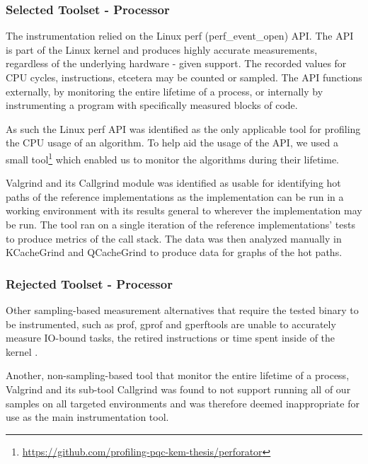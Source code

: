 \subsubsection{Selected Toolset - Processor}
\label{section:method:experiment:phase1:selected-toolset-processor}
The instrumentation relied on the Linux perf (perf\_event\_open) API. The API is part of the Linux kernel and produces highly accurate measurements, regardless of the underlying hardware - given support. The recorded values for CPU cycles, instructions, etcetera may be counted or sampled. The API functions externally, by monitoring the entire lifetime of a process, or internally by instrumenting a program with specifically measured blocks of code.

As such the Linux perf API was identified as the only applicable tool for profiling the CPU usage of an algorithm. To help aid the usage of the API, we used a small tool\footnote{\href{https://github.com/profiling-pqc-kem-thesis/perforator}{https://github.com/profiling-pqc-kem-thesis/perforator}} which enabled us to monitor the algorithms during their lifetime.

Valgrind and its Callgrind module was identified as usable for identifying hot paths of the reference implementations as the implementation can be run in a working environment with its results general to wherever the implementation may be run. The tool ran on a single iteration of the reference implementations' tests to produce metrics of the call stack. The data was then analyzed manually in KCacheGrind and QCacheGrind to produce data for graphs of the hot paths.

\subsubsection{Rejected Toolset - Processor}
\label{section:method:experiment:phase1:rejected-toolset-processor}
Other sampling-based measurement alternatives that require the tested binary to be instrumented, such as prof, gprof and gperftools are unable to accurately measure IO-bound tasks, the retired instructions or time spent inside of the kernel \cite{gprof}.

Another, non-sampling-based tool that monitor the entire lifetime of a process, Valgrind and its sub-tool Callgrind was found to not support running all of our samples on all targeted environments and was therefore deemed inappropriate for use as the main instrumentation tool.

